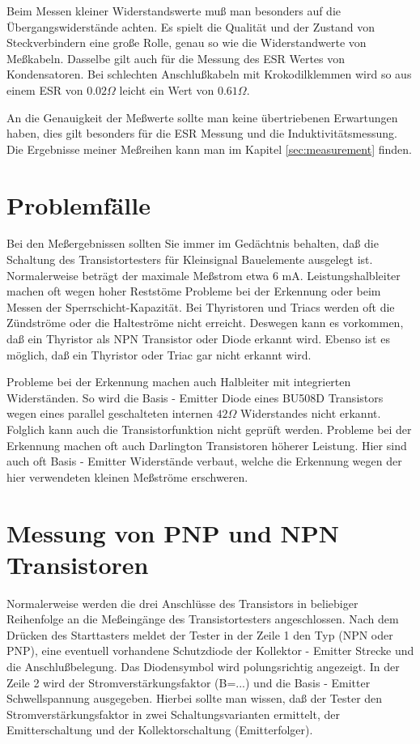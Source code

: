 Beim Messen kleiner Widerstandswerte muß man besonders auf die Übergangswiderstände achten.
Es spielt die Qualität und der Zustand von Steckverbindern eine große Rolle, genau so wie die
Widerstandwerte von Meßkabeln. Dasselbe gilt auch für die Messung des ESR Wertes von Kondensatoren.
Bei schlechten Anschlußkabeln mit Krokodilklemmen wird so aus einem ESR von \(0.02 \Omega\) leicht
ein Wert von \(0.61 \Omega\).

An die Genauigkeit der Meßwerte sollte man keine übertriebenen Erwartungen haben, dies gilt besonders
für die ESR Messung und die Induktivitätsmessung.
Die Ergebnisse meiner Meßreihen kann man im Kapitel \ref{sec:measurement} finden.


\section{Problemfälle}
Bei den Meßergebnissen sollten Sie immer im Gedächtnis behalten, daß die Schaltung des Transistortesters für
Kleinsignal Bauelemente ausgelegt ist. Normalerweise beträgt der maximale Meßstrom etwa 6 mA.
Leistungshalbleiter machen oft wegen hoher Reststöme Probleme bei der Erkennung oder beim Messen der
Sperrschicht-Kapazität.
Bei Thyristoren und Triacs werden oft die Zündströme oder die Halteströme nicht erreicht. Deswegen kann es
vorkommen, daß ein Thyristor als NPN Transistor oder Diode erkannt wird. Ebenso ist es möglich, daß ein 
Thyristor oder Triac gar nicht erkannt wird.

Probleme bei der Erkennung machen auch Halbleiter mit integrierten Widerständen.
So wird die Basis - Emitter Diode eines BU508D Transistors wegen eines parallel geschalteten internen
\(42 \Omega\) Widerstandes nicht erkannt.
Folglich kann auch die Transistorfunktion nicht geprüft werden.
Probleme bei der Erkennung machen oft auch Darlington Transistoren höherer Leistung. Hier sind auch
oft Basis - Emitter Widerstände verbaut, welche die Erkennung wegen der hier verwendeten kleinen Meßströme erschweren.

\section{Messung von PNP und NPN Transistoren}
Normalerweise werden die drei Anschlüsse des Transistors in beliebiger Reihenfolge an die Meßeingänge des
Transistortesters angeschlossen.
Nach dem Drücken des Starttasters meldet der Tester in der Zeile 1 den Typ (NPN oder PNP), 
eine eventuell vorhandene Schutzdiode der Kollektor - Emitter Strecke und
die Anschlußbelegung. Das Diodensymbol wird  polungsrichtig angezeigt.
In der Zeile 2 wird der Stromverstärkungsfaktor (B=...) und die Basis - Emitter Schwellspannung ausgegeben.
Hierbei sollte man wissen, daß der Tester den Stromverstärkungsfaktor in zwei Schaltungsvarianten 
ermittelt, der Emitterschaltung und der Kollektorschaltung (Emitterfolger).

